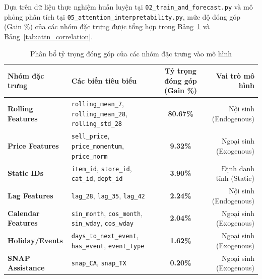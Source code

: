 \documentclass[12pt,a4paper,oneside]{article}
\begin{document}
Dựa trên dữ liệu thực nghiệm huấn luyện tại \texttt{02\_train\_and\_forecast.py} và mô phỏng phân tích tại \texttt{05\_attention\_interpretability.py}, mức độ đóng góp (Gain \%) của các nhóm đặc trưng được tổng hợp trong Bảng~\ref{tab:group_importance} và Bảng~\ref{tab:attn_correlation}.

\begin{table}[htbp]
\centering
\caption{Phân bổ tỷ trọng đóng góp của các nhóm đặc trưng vào mô hình}
\label{tab:group_importance}
\begin{tabular}{lp{6.5cm}cr}
\toprule
\textbf{Nhóm đặc trưng} & \textbf{Các biến tiêu biểu} & \textbf{Tỷ trọng đóng góp (Gain \%)} & \textbf{Vai trò mô hình} \\
\midrule
\textbf{Rolling Features} & \texttt{rolling\_mean\_7}, \texttt{rolling\_mean\_28}, \texttt{rolling\_std\_28} & \textbf{80.67\%} & Nội sinh (Endogenous) \\
\textbf{Price Features}   & \texttt{sell\_price}, \texttt{price\_momentum}, \texttt{price\_norm} & \textbf{9.32\%} & Ngoại sinh (Exogenous) \\
\textbf{Static IDs}       & \texttt{item\_id}, \texttt{store\_id}, \texttt{cat\_id}, \texttt{dept\_id} & \textbf{3.90\%} & Định danh tĩnh (Static) \\
\textbf{Lag Features}     & \texttt{lag\_28}, \texttt{lag\_35}, \texttt{lag\_42} & \textbf{2.24\%} & Nội sinh (Endogenous) \\
\textbf{Calendar Features}& \texttt{sin\_month}, \texttt{cos\_month}, \texttt{sin\_wday}, \texttt{cos\_wday} & \textbf{2.04\%} & Ngoại sinh (Exogenous) \\
\textbf{Holiday/Events}   & \texttt{days\_to\_next\_event}, \texttt{has\_event}, \texttt{event\_type} & \textbf{1.62\%} & Ngoại sinh (Exogenous) \\
\textbf{SNAP Assistance}  & \texttt{snap\_CA}, \texttt{snap\_TX} & \textbf{0.20\%} & Ngoại sinh (Exogenous) \\
\bottomrule
\end{tabular}
\end{table}
\end{document}
